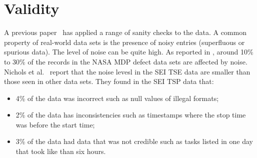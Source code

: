 \documentclass{sig-alternate}
\newcommand{\bi}{\begin{itemize}[leftmargin=0.4cm]}
\newcommand{\ei}{\end{itemize}}
\def\baselinestretch{1}
\begin{document}
 


%

%


 


 

\section{Validity} 
A previous paper~\cite{shirai14} has applied a range of sanity checks to the data.
A common property of real-world data sets is the presence
of noisy entries (superfluous  or spurious data). 
The level of noise can be quite high. As reported
in \cite{shepperd12}, around
10\% to 30\%
of the records in the NASA MDP defect data sets are
affected by noise. Nichols et al.~\cite{shirai14}  report that
the noise levesl in the SEI TSE data are smaller than those seen
in other data sets. They found in the SEI TSP data that:\bi 
\item
4\% of the data was incorrect such as  null values of illegal formats;
\item  2\% of the data has inconsistencies such as timestamps
where the stop time was before the start time;
\item 3\% of the data had data that was not credible
such as tasks listed in one day that took like than six hours.
\ei 
\end{document}
